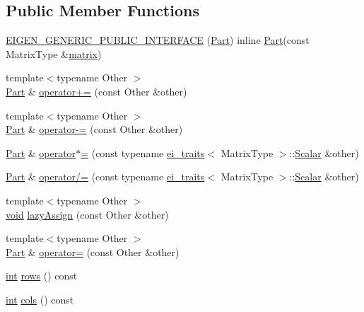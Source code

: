 \subsection*{Public Member Functions}
\begin{DoxyCompactItemize}
\item 
\hyperlink{class_part_af1f6a128508fe568d73324b524540e44}{E\-I\-G\-E\-N\-\_\-\-G\-E\-N\-E\-R\-I\-C\-\_\-\-P\-U\-B\-L\-I\-C\-\_\-\-I\-N\-T\-E\-R\-F\-A\-C\-E} (\hyperlink{class_part}{Part}) inline \hyperlink{class_part}{Part}(const Matrix\-Type \&\hyperlink{glext_8h_a7b24a3f2f56eb1244ae69dacb4fecb6f}{matrix})
\item 
{\footnotesize template$<$typename Other $>$ }\\\hyperlink{class_part}{Part} \& \hyperlink{class_part_a115ff3747c9e8217aab5aecd25e7d901}{operator+=} (const Other \&other)
\item 
{\footnotesize template$<$typename Other $>$ }\\\hyperlink{class_part}{Part} \& \hyperlink{class_part_a71a4c6a9b8070544b2524dbf4cdedd90}{operator-\/=} (const Other \&other)
\item 
\hyperlink{class_part}{Part} \& \hyperlink{class_part_ac84dfdca9718a21a362eef374f5da276}{operator$\ast$=} (const typename \hyperlink{structei__traits}{ei\-\_\-traits}$<$ Matrix\-Type $>$\-::\hyperlink{class_matrix_base_a625df8339dc2d816cbc0fd66e7dadaf5}{Scalar} \&other)
\item 
\hyperlink{class_part}{Part} \& \hyperlink{class_part_ab003ec4ef837af2ecc73ab54338732fd}{operator/=} (const typename \hyperlink{structei__traits}{ei\-\_\-traits}$<$ Matrix\-Type $>$\-::\hyperlink{class_matrix_base_a625df8339dc2d816cbc0fd66e7dadaf5}{Scalar} \&other)
\item 
{\footnotesize template$<$typename Other $>$ }\\\hyperlink{group___u_a_v_objects_plugin_ga444cf2ff3f0ecbe028adce838d373f5c}{void} \hyperlink{class_part_a662e78895466eed10327d566dfadb7c3}{lazy\-Assign} (const Other \&other)
\item 
{\footnotesize template$<$typename Other $>$ }\\\hyperlink{class_part}{Part} \& \hyperlink{class_part_a5f09cb90991ae66fc36834d66ef2c62b}{operator=} (const Other \&other)
\item 
\hyperlink{ioapi_8h_a787fa3cf048117ba7123753c1e74fcd6}{int} \hyperlink{class_part_aad5fc024c50094465f06d228992540a1}{rows} () const 
\item 
\hyperlink{ioapi_8h_a787fa3cf048117ba7123753c1e74fcd6}{int} \hyperlink{class_part_afb4c9644fa44a8a97652222ee7d0ca91}{cols} () const 

\end{DoxyCompactItemize}
